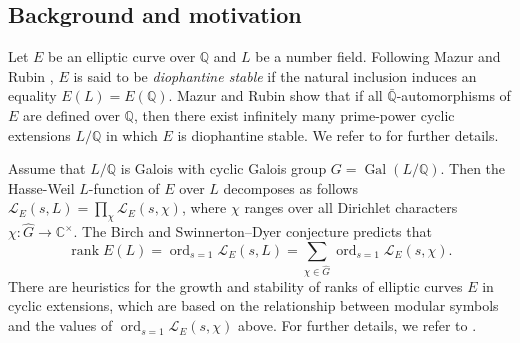 \documentclass[12pt]{amsart}
\newtheorem{conjecture}[theorem]{Conjecture}
\newcommand{\Q}{\mathbb{Q}}
\newcommand{\op}[1]{\operatorname{#1}}
\numberwithin{equation}{section}
\begin{document}
\subsection{Background and motivation} 
\par Let $E$ be an elliptic curve over $\Q$ and $L$ be a number field. Following Mazur and Rubin \cite{Mazurrubindiophantine}, $E$ is said to be \emph{diophantine stable} if the natural inclusion induces an equality $E(L)=E(\Q)$. Mazur and Rubin show that if all $\bar{\Q}$-automorphisms of $E$ are defined over $\Q$, then there exist infinitely many prime-power cyclic extensions $L/\Q$ in which $E$ is diophantine stable. We refer to \cite[Theorem 1.2 and Theorem 1.3]{Mazurrubindiophantine} for further details.
\par Assume that $L/\Q$ is Galois with cyclic Galois group $G=\op{Gal}(L/\Q)$. Then the Hasse-Weil $L$-function of $E$ over $L$ decomposes as follows $\mathscr{L}_E(s,  L) = \prod_{\chi}\mathscr{L}_E(s, \chi)$,
where $\chi$ ranges over all Dirichlet characters $\chi: \widehat{G}\rightarrow \mathbb{C}^\times$. The Birch and Swinnerton--Dyer conjecture predicts that 
\[\op{rank} E(L)=\op{ord}_{s=1} \mathscr{L}_E(s, L)=\sum_{\chi\in \widehat{G}} \op{ord}_{s=1}\mathscr{L}_E(s,  \chi). \]There are heuristics for the growth and stability of ranks of elliptic curves $E$ in cyclic extensions, which are based on the relationship between modular symbols and the values of $\op{ord}_{s=1}\mathscr{L}_E(s,  \chi)$ above. For further details, we refer to \cite{Mazurrubinmodsymbols}. 

\end{document}

